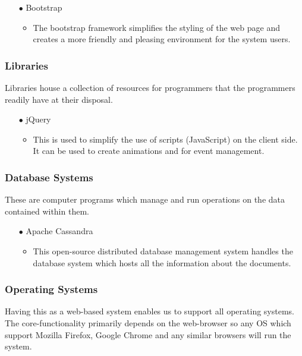 \documentclass[a4paper,12pt]{article}
\begin{document}
\begin{flushleft}
	\begin{itemize}
		\item[$\bullet$] Bootstrap
		\begin{itemize}
		\item The bootstrap framework simplifies the styling of the web page and creates a more friendly and pleasing environment for the system users.	
		\end{itemize}
	\end{itemize}
	
	\subsubsection{Libraries}
	Libraries house a collection of resources for programmers that the programmers readily have at their disposal.
	
	\begin{itemize}
		\item[$\bullet$] jQuery
		\begin{itemize}
		\item This is used to simplify the use of scripts (JavaScript) on the client side. It can be used to create animations and for event management.
		\end{itemize}
	\end{itemize}
	
	\subsubsection{Database Systems}
	These are computer programs which manage and run operations on the data contained within them.
	
	\begin{itemize}
		\item[$\bullet$] Apache Cassandra
		\begin{itemize}
		\item This open-source distributed database management system handles the database system which hosts all the information about the documents.
		\end{itemize}
	\end{itemize}
	
	\subsubsection{Operating Systems}
	Having this as a web-based system enables us to support all operating systems. The core-functionality primarily depends on the web-browser so any OS which support Mozilla Firefox, Google Chrome and any similar browsers will run the system.

\end{flushleft}
\end{document}
